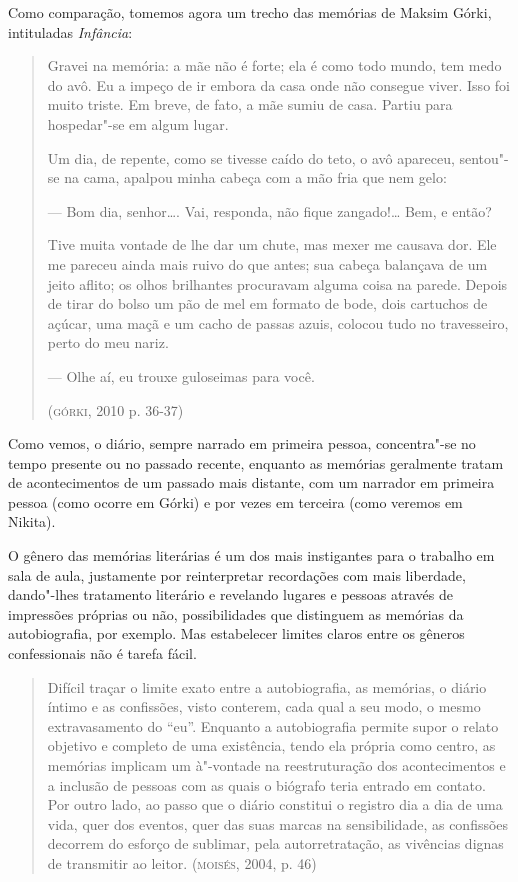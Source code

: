 \documentclass[11pt]{extarticle}
\begin{document}
Como comparação, tomemos agora um trecho das memórias de Maksim Górki,
intituladas \emph{Infância}:

\begin{quote}
Gravei na memória: a mãe não é forte; ela é como todo mundo, tem medo do
avô. Eu a impeço de ir embora da casa onde não consegue viver. Isso foi
muito triste. Em breve, de fato, a mãe sumiu de casa. Partiu para
hospedar"-se em algum lugar.

Um dia, de repente, como se tivesse caído do teto, o avô apareceu,
sentou"-se na cama, apalpou minha cabeça com a mão fria que nem gelo:

--- Bom dia, senhor\ldots{}. Vai, responda, não fique zangado!\ldots{} Bem, e
então?

Tive muita vontade de lhe dar um chute, mas mexer me causava dor. Ele me
pareceu ainda mais ruivo do que antes; sua cabeça balançava de um jeito
aflito; os olhos brilhantes procuravam alguma coisa na parede. Depois de
tirar do bolso um pão de mel em formato de bode, dois cartuchos de
açúcar, uma maçã e um cacho de passas azuis, colocou tudo no
travesseiro, perto do meu nariz.

--- Olhe aí, eu trouxe guloseimas para você.

(\textsc{górki}, 2010 p. 36-37)
\end{quote}



Como vemos, o diário, sempre narrado em primeira pessoa, concentra"-se no
tempo presente ou no passado recente, enquanto as memórias geralmente
tratam de acontecimentos de um passado mais distante, com um narrador em
primeira pessoa (como ocorre em Górki) e por vezes em terceira (como
veremos em Nikita).

O gênero das memórias literárias é um dos mais instigantes para o
trabalho em sala de aula, justamente por reinterpretar recordações com
mais liberdade, dando"-lhes tratamento literário e revelando lugares e
pessoas através de impressões próprias ou não, possibilidades que
distinguem as memórias da autobiografia, por exemplo. Mas estabelecer
limites claros entre os gêneros confessionais não é tarefa fácil.

\begin{quote}
Difícil traçar o limite exato entre a autobiografia, as memórias, o
diário íntimo e as confissões, visto conterem, cada qual a seu modo, o
mesmo extravasamento do ``eu''. Enquanto a autobiografia permite supor o
relato objetivo e completo de uma existência, tendo ela própria como
centro, as memórias implicam um à"-vontade na reestruturação dos
acontecimentos e a inclusão de pessoas com as quais o biógrafo teria
entrado em contato. Por outro lado, ao passo que o diário constitui o
registro dia a dia de uma vida, quer dos eventos, quer das suas marcas
na sensibilidade, as confissões decorrem do esforço de sublimar, pela
autorretratação, as vivências dignas de transmitir ao leitor. (\textsc{moisés},
2004, p. 46)
\end{quote}
\end{document}
